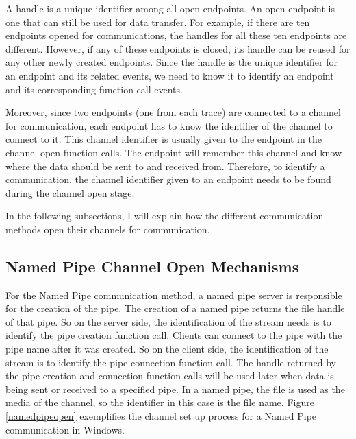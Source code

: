 A handle is a unique identifier among all open endpoints. An open endpoint is one that can still be used for data transfer. For example, if there are ten endpoints opened for communications, the handles for all these ten endpoints are different. However, if any of these endpoints is closed, its handle can be reused for any other newly created endpoints. Since the handle is the unique identifier for an endpoint and its related events, we need to know it to identify an endpoint and its corresponding function call events. 

Moreover, since two endpoints (one from each trace) are connected to a channel for communication, each endpoint has to know the identifier of the channel to connect to it. This channel identifier is usually given to the endpoint in the channel open function calls. The endpoint will remember this channel and know where the data should be sent to and received from. Therefore, to identify a communication, the channel identifier given to an endpoint needs to be found during the channel open stage.

In the following subsections, I will explain how the different communication methods open their channels for communication.

\subsection{Named Pipe Channel Open Mechanisms} 
For the Named Pipe communication method, a named pipe server is responsible for the creation of the pipe. The creation of a named pipe returns the file handle of that pipe. So on the server side, the identification of the stream needs is to identify the pipe creation function call. Clients can connect to the pipe with the pipe name after it was created. So on the client side, the identification of the stream is to identify the pipe connection function call. The handle returned by the pipe creation and connection function calls will be used later when data is being sent or received to a specified pipe. In a named pipe, the file is used as the media of the channel, so the identifier in this case is the file name. \cite{WinNamedpipe} Figure \ref{namedpipeopen} exemplifies the channel set up process for a Named Pipe communication in Windows. 

